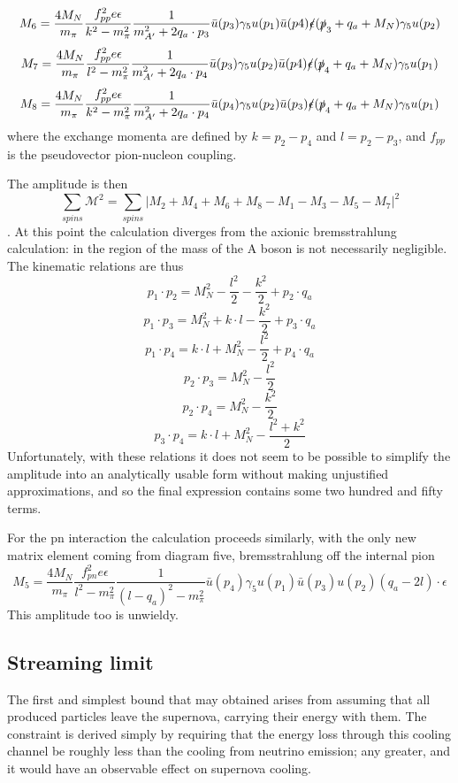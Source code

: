 \documentclass[10pt,a4paper]{article}
\begin{document}
		\[ M_6 = \frac{4 M_N}{ m_\pi} \frac{f_{pp}^2 e \epsilon}{k^2-m_\pi^2
		 		 }  \frac{1}{m_{A^\prime}^2 + 2 q_a \cdot p_3} \bar{u}(p_3) \gamma_5 u(p_1) \bar{u}(p4) \slashed{\epsilon} (\slashed{p}_3 + q_a +M_N)\gamma_5 u(p_2)\]
 		 \[ M_7 = \frac{4 M_N}{ m_\pi} \frac{f_{pp}^2 e \epsilon}{l^2-m_\pi^2
		 		 }  \frac{1}{m_{A^\prime}^2 + 2 q_a \cdot p_4} \bar{u}(p_3) \gamma_5 u(p_2) \bar{u}(p4) \slashed{\epsilon} (\slashed{p}_4 + q_a +M_N)\gamma_5 u(p_1)\]
		\[ M_8 = \frac{4 M_N}{ m_\pi} \frac{f_{pp}^2 e \epsilon}{k^2-m_\pi^2
		}  \frac{1}{m_{A^\prime}^2 + 2 q_a \cdot p_4} \bar{u}(p_4) \gamma_5 u(p_2) \bar{u}(p_3) \slashed{\epsilon} (\slashed{p}_4 + q_a +M_N)\gamma_5 u(p_1)\]
	where the exchange momenta are defined by $ k = p_2-p_4 $ and $ l = p_2-p_3 $, and $ f_{pp} $ is the pseudovector pion-nucleon coupling.

	The amplitude is then \[  \sum_{spins} \mathcal{M}^2 = \sum_{spins}|M_2+M_4+M_6+M_8-M_1-M_3-M_5-M_7|^2  \]. At this point the calculation diverges from the axionic bremsstrahlung calculation: in the region of the mass of the A boson is not necessarily negligible. The kinematic relations are thus \[ 
	p_1 \cdot p_2 = M_N^2 - \frac{l^2}{2} - \frac{k^2}{2} + p_2 \cdot q_a\]
	 \[p_1 \cdot p_3 = M_N^2 + k \cdot l - \frac{k^2}{2} + p_3 \cdot q_a\]  
	 \[p_1 \cdot p_4 = k \cdot l + M_N^2 - \frac{l^2}{2} + p_4 \cdot q_a \]
	 \[p_2 \cdot p_3 = M_N^2 - \frac{l^2}{2} \]
 	 \[p_2 \cdot p_4 = M_N^2 - \frac{k^2}{2} \]
 	 \[p_3 \cdot p_4 = k \cdot l + M_N^2 - \frac{l^2 + k^2}{2} \]
 	 Unfortunately, with these relations it does not seem to be possible to simplify the amplitude into an analytically usable form without making unjustified approximations, and so the final expression contains some two hundred and fifty terms. 
 	 
 	 For the pn interaction the calculation proceeds similarly, with the only new matrix element coming from diagram five, bremsstrahlung off the internal pion 
 	 \[ M_5 = \frac{4 M_N}{ m_\pi} \frac{f_{pn}^2 e \epsilon}{l^2-m_\pi^2
 	 }  \frac{1}{(l-q_a)^2 - m_\pi^2} \bar{u}(p_4) \gamma_5 u(p_1) \bar{u}(p_3) u(p_2) (q_a - 2l)\cdot \epsilon \]
	This amplitude too is unwieldy.  
	

	\subsection{Streaming limit}
	The first and simplest bound that may obtained arises from assuming that all produced particles leave the supernova, carrying their energy with them. The constraint is derived simply by requiring that the energy loss through this cooling channel be roughly less than the cooling from neutrino emission; any greater, and it would have an observable effect on supernova cooling.
\end{document}
